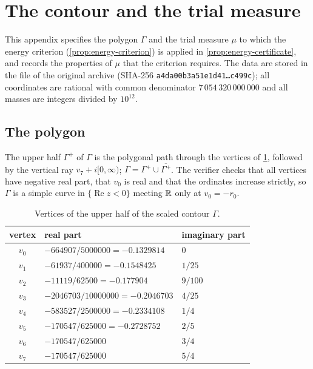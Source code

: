 \section{The contour and the trial measure}\label{sec:contour-and-measure}

This appendix specifies the polygon $\Gamma$ and the trial measure $\mu$ to which the energy
criterion (\cref{prop:energy-criterion}) is applied in \cref{prop:energy-certificate}, and records
the properties of $\mu$ that the criterion requires. The data are stored in the file  of the original archive (SHA-256
\texttt{a4da00b3a51e1d41\ldots c499c}); all coordinates are rational with common denominator
$7\,054\,320\,000\,000$ and all masses are integers divided by $10^{12}$.

\subsection{The polygon}\label{subsec:polygon}

The upper half $\Gamma^+$ of $\Gamma$ is the polygonal path through the vertices of
\cref{tab:vertices}, followed by the vertical ray $v_7+i[0,\infty)$; $\Gamma=\Gamma^+\cup\overline{\Gamma^+}$.
The verifier checks that all vertices have negative real part, that $v_0$ is real and that the
ordinates increase strictly, so $\Gamma$ is a simple curve in $\{\operatorname{Re}z<0\}$ meeting
$\mathbb{R}$ only at $v_0=-r_0$.

\begin{table}[ht]
\centering
\small
\begin{tabular}{@{}cll@{}}
\toprule
vertex & real part & imaginary part\\
\midrule
$v_0$ & $-664907/5000000=-0.1329814$ & $0$\\
$v_1$ & $-61937/400000=-0.1548425$ & $1/25$\\
$v_2$ & $-11119/62500=-0.177904$ & $9/100$\\
$v_3$ & $-2046703/10000000=-0.2046703$ & $4/25$\\
$v_4$ & $-583527/2500000=-0.2334108$ & $1/4$\\
$v_5$ & $-170547/625000=-0.2728752$ & $2/5$\\
$v_6$ & $-170547/625000$ & $3/4$\\
$v_7$ & $-170547/625000$ & $5/4$\\
\bottomrule
\end{tabular}
\caption{Vertices of the upper half of the scaled contour $\Gamma$.}
\label{tab:vertices}
\end{table}

